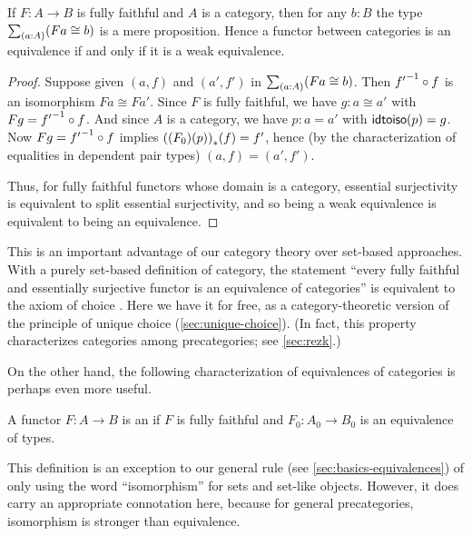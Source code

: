 \begin{lem}\label{ct:catweq}
  If $F:A\to B$ is fully faithful and $A$ is a category, then for any $b:B$ the type $\sm{a:A} (Fa\cong b)$ is a mere proposition.
  Hence a functor between categories is an equivalence if and only if it is a weak equivalence.
\end{lem}
\begin{proof}
  Suppose given $(a,f)$ and $(a',f')$ in $\sm{a:A} (Fa\cong b)$.
  Then ${f'}^{-1}\circ f$ is an isomorphism $Fa \cong Fa'$.
  Since $F$ is fully faithful, we have $g:a\cong a'$ with $Fg = {f'}^{-1}\circ f$.
  And since $A$ is a category, we have $p:a=a'$ with $\mathsf{idtoiso}(p)=g$.
  Now $Fg = {f'}^{-1}\circ f$ implies ${({(F_0)}\mathopen{}\left({p}\right)\mathclose{})}_{*}\mathopen{}\left({f}\right)\mathclose{} = f'$, hence (by the characterization of equalities in dependent pair types) $(a,f)=(a',f')$.

  Thus, for fully faithful functors whose domain is a category, essential surjectivity is equivalent to split essential surjectivity, and so being a weak equivalence is equivalent to being an equivalence.
\end{proof}

This is an important advantage of our category theory over set-based approaches.
With a purely set-based definition of category, the statement ``every fully faithful and essentially surjective functor is an equivalence of categories'' is equivalent to the axiom of choice \choice{}.
Here we have it for free, as a category-theoretic version of the principle of unique choice (\cref{sec:unique-choice}).
(In fact, this property characterizes categories among precategories; see \cref{sec:rezk}.)

On the other hand, the following characterization of equivalences of categories is perhaps even more useful.

\begin{defn}\label{ct:isocat}
  A functor $F:A\to B$ is an 
  if $F$ is fully faithful and $F_0:A_0\to B_0$ is an equivalence of types.
\end{defn}

This definition is an exception to our general rule (see \cref{sec:basics-equivalences}) of only using the word ``isomorphism'' for sets and set-like objects.
However, it does carry an appropriate connotation here, because for general precategories, isomorphism is stronger than equivalence.

